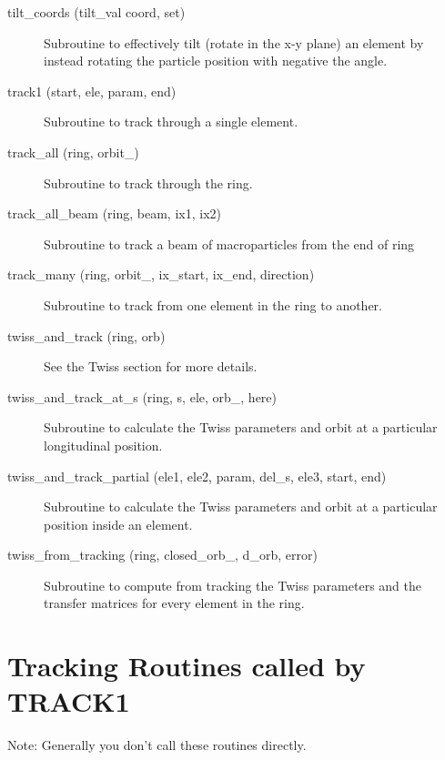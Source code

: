 \begin{description}
\item[tilt\_coords (tilt\_val coord, set)] \Newline
Subroutine to effectively tilt (rotate in the x-y plane) an element by 
instead rotating the particle position with negative the angle. 

\item[track1 (start, ele, param, end)] \Newline
Subroutine to track through a single element. 

\item[track\_all (ring, orbit\_)] \Newline
Subroutine to track through the ring. 

\item[track\_all\_beam (ring, beam, ix1, ix2)] \Newline 
     Subroutine to track a beam of macroparticles from the end of
     ring%

\item[track\_many (ring, orbit\_, ix\_start, ix\_end, direction)] \Newline
Subroutine to track from one element in the ring to another. 

\item[twiss\_and\_track (ring, orb)] \Newline
See the Twiss section for more details. 

\item[twiss\_and\_track\_at\_s (ring, s, ele, orb\_, here)] \Newline
Subroutine to calculate the Twiss parameters and orbit at a particular longitudinal position. 

\item[twiss\_and\_track\_partial (ele1, ele2, param, del\_s, ele3, start, end)] \Newline
Subroutine to calculate the Twiss parameters and orbit at a particular position inside an element. 

\item[twiss\_from\_tracking (ring, closed\_orb\_, d\_orb, error)] \Newline
Subroutine to compute from tracking the Twiss parameters and the transfer matrices 
for every element in the ring. 

\end{description}

\section{Tracking Routines called by TRACK1}
\label{r:track1}   

Note: Generally you don't call these routines directly.

